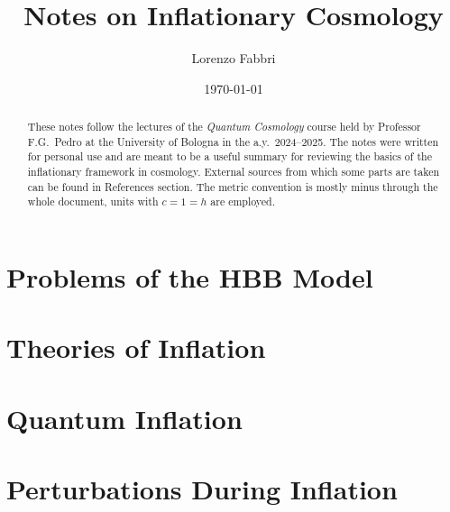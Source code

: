 \documentclass[12pt,a4paper]{article}
\title{\Huge\bfseries Notes on Inflationary Cosmology}
\author{Lorenzo Fabbri}
\date{\today}
\begin{document}
\maketitle
\vspace{-1cm}
\begin{abstract}
These notes follow the lectures of the \emph{Quantum Cosmology} course held by Professor F.G.\ Pedro at the University of Bologna in the a.y.\ 2024--2025.  
The notes were written for personal use and are meant to be a useful summary for reviewing the basics of the inflationary framework in cosmology. External sources from which some parts are taken can be found in References section. The metric convention is mostly minus through the whole document, units with $c=1=h$ are employed.
\end{abstract}
\thispagestyle{empty}

\renewcommand{\numberline}[1]{}
{%
  \hypersetup{hidelinks}
  \tableofcontents
}%
\vspace{1cm}
\newpage
\section{Problems of the HBB Model}\label{sec:section1}


\newpage
\section{Theories of Inflation}\label{sec:section2}


\newpage

\section{Quantum Inflation}\label{sec:section3}






\newpage

\section{Perturbations During Inflation}\label{sec:section4}




\end{document}
